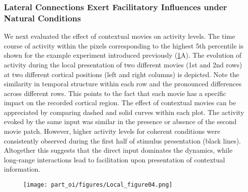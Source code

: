 	\subsubsection{Lateral Connections Exert Facilitatory Influences under Natural Conditions}

\label{oi_local_fac}


We next evaluated the effect of contextual movies on activity levels. The
time course of activity within the pixels corresponding to the highest 5th
percentile is shown for the example experiment introduced previously
(\ref{loc_m2d}A). The evolution of activity during the local presentation of two
different movies (1st and 2nd rows) at two different cortical positions
(left and right columns) is depicted. Note the similarity in temporal
structure within each row and the pronounced differences across different
rows. This points to the fact that each movie has a specific impact on the
recorded cortical region. The effect of contextual movies can be
appreciated by comparing dashed and solid curves within each plot. The
activity evoked by the same input was similar in the presence or absence of
the second movie patch. However, higher activity levels for coherent
conditions were consistently observed during the first half of stimulus
presentation (black lines). Altogether this suggests that the direct input
dominates the dynamics, while long-range interactions lead to facilitation
upon presentation of contextual information.  


\begin{figure}[!htb]
\texttt{[image: part\_oi/figures/Local\_figure04.png]}
\caption[Distant Natural Stimulus Exerts Facilitatory Effects on Local
Activity Levels.]{\protect} 
\label{loc_m2d}
\end{figure} 



